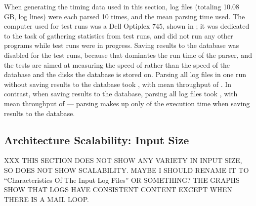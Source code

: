 When generating the timing data used in this section, \numberOFlogFILES{}
log files (totaling 10.08 GB, \numberOFlogLINEShuman{} log lines) were each
parsed 10 times, and the mean parsing time used.  The computer used for
test runs was a Dell Optiplex 745, shown in ; it was dedicated to the task of
gathering statistics from test runs, and did not run any other programs
while test runs were in progress.  Saving results to the database was
disabled for the test runs, because that dominates the run time of the
parser, and the tests are aimed at measuring the speed of \parsername{}
rather than the speed of the database and the disks the database is stored
on.  Parsing all \numberOFlogFILES{} log files in one run without saving
results to the database took , with
mean throughput of .  In contrast,
when saving results to the database, parsing all \numberOFlogFILES{} log
files took , with mean
throughput of  --- parsing
makes up only
 of the
execution time when saving results to the database.

\subsection{Architecture Scalability: Input Size}

XXX THIS SECTION DOES NOT SHOW ANY VARIETY IN INPUT SIZE, SO DOES NOT SHOW
SCALABILITY\@.  MAYBE I SHOULD RENAME IT TO ``Characteristics Of The Input
Log Files'' OR SOMETHING\@?  THE GRAPHS SHOW THAT LOGS HAVE CONSISTENT
CONTENT EXCEPT WHEN THERE IS A MAIL LOOP\@.

